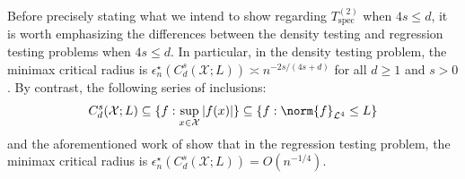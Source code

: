 \documentclass{article}
\newcommand{\abs}[1]{\left \lvert #1 \right \rvert}
\newcommand{\1}{\mathbf{1}}
\newcommand{\Pbb}{\mathbb{P}}
\theoremstyle{alden}
\theoremstyle{aldenthm}
\theoremstyle{definition}
\theoremstyle{remark}
\begin{document}

Before precisely stating what we intend to show regarding $T_{\mathrm{spec}}^{(2)}$ when $4s \leq d$, it is worth emphasizing the differences between the density testing and regression testing problems when $4s \leq d$. In particular, in the density testing problem, the minimax critical radius is $\epsilon_n^{\star}(C_d^{s}(\mathcal{X};L)) \asymp n^{-2s/(4s + d)}$ for all $d \geq 1$ and $s > 0$. By contrast, the following series of inclusions:
\begin{equation*}
C_d^{s}(\mathcal{X};L) \subseteq \{f: \sup_{x \in \mathcal{X}}\abs{f(x)}\} \subseteq \{f: \norm{f}_{\mathcal{L}^4} \leq L\}
\end{equation*}
and the aforementioned work of \citet{guerre02} show that in the regression testing problem, the minimax critical radius is $\epsilon_n^{\star}(C_d^{s}(\mathcal{X};L)) = O(n^{-1/4})$. 
\end{document}

